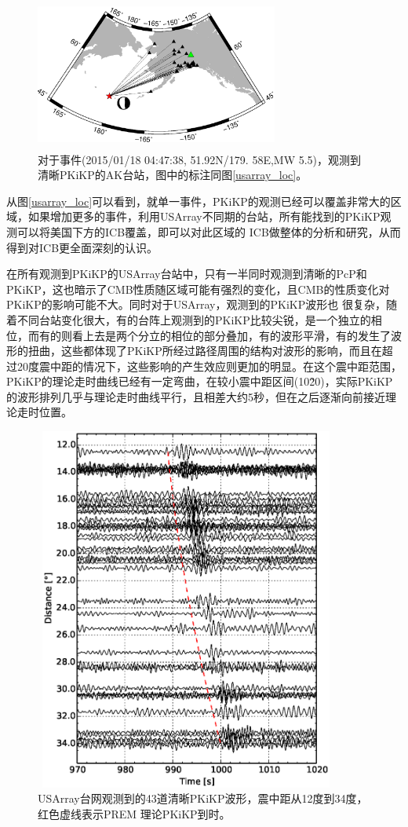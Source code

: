 \begin{figure}[!ht]
	\centering
	\includegraphics[width=8cm,height=5cm]{fig/chap3/ak_loc.eps}
	\caption{对于事件(2015/01/18 04:47:38, 51.92{\textdegree}N/179.%
58{\textdegree}E,MW 5.5)，观测到清晰PKiKP的AK台站，图中的标注同图\ref{usarray_loc}。}
	\label{ak_loc}
\end{figure}

从图\ref{usarray_loc}可以看到，就单一事件，PKiKP的观测已经可以覆盖非常大的区域，如果增加更多的事件，利用USArray不同期的台站，所有能找到的PKiKP观测可以将美国下方的ICB覆盖，即可以对此区域的
ICB做整体的分析和研究，从而得到对ICB更全面深刻的认识。

在所有观测到PKiKP的USArray台站中，只有一半同时观测到清晰的PcP和PKiKP，这也暗示了CMB性质随区域可能有强烈的变化，且CMB的性质变化对PKiKP的影响可能不大。同时对于USArray，观测到的PKiKP波形也
很复杂，随着不同台站变化很大，有的台阵上观测到的PKiKP比较尖锐，是一个独立的相位，而有的则看上去是两个分立的相位的部分叠加，有的波形平滑，有的发生了波形的扭曲，这些都体现了PKiKP所经过路径周围的结构对波形的影响，而且在超过20度震中距的情况下，这些影响的产生效应则更加的明显。在这个震中距范围，
PKiKP的理论走时曲线已经有一定弯曲，在较小震中距区间(10\~20)，实际PKiKP的波形排列几乎与理论走时曲线平行，且相差大约5秒，但在之后逐渐向前接近理论走时位置。

\begin{figure}[!ht]
	\centering
	\includegraphics[width=10cm,height=12cm]{fig/chap3/usarray_sec.eps}
	\caption{USArray台网观测到的43道清晰PKiKP波形，震中距从12度到34度，红色虚线表示PREM%
理论PKiKP到时。}
	\label{usarray_sec}
\end{figure}

